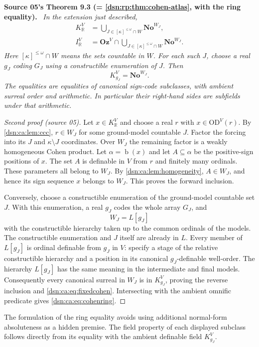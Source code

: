 \documentclass[11pt,a4paper]{article}
\numberwithin{equation}{section}
\theoremstyle{definition}
\theoremstyle{remark}
\newcommand{\No}{\mathbf{No}}
\newcommand{\Oz}{\mathbf{Oz}}
\newcommand{\OD}{\mathrm{OD}}
\newcommand{\R}{\mathbb R}
\newcommand{\bd}{\operatorname{b}}
\newenvironment{dupstatement}[1]{\par\medskip\noindent\textbf{#1.}\ \begingroup\itshape\ignorespaces}{\endgroup\par\medskip}
\newcommand{\KR}{K_{\R}}
\newcommand{\IR}{I_{\R}}
\begin{document}
\begin{dupstatement}{Source 05's Theorem 9.3 (= \cref{dsn:rp:thm:cohen-atlas}, with the ring equality)}
In the extension just described,
\begin{align}
 \KR^V
 &=\bigcup_{J\in[\kappa]^{\le\omega}\cap W}\No^{W_J},
 \label{dsn:ca:eq:cohenfield}\\
 \IR^V
 &=\Oz^V\cap
   \bigcup_{J\in[\kappa]^{\le\omega}\cap W}\No^{W_J}.
 \label{dsn:ca:eq:cohenring}
\end{align}
Here $[\kappa]^{\le\omega}\cap W$ means the sets countable \emph{in
$W$}. For each such $J$, choose a real $g_J$ coding $G_J$ using a
constructible enumeration of $J$. Then
\begin{equation}\label{dsn:ca:eq:fixedcohen}
 K_{g_J}^{V}=\No^{W_J}.
\end{equation}
The equalities are equalities of canonical sign-code subclasses, with
ambient surreal order and arithmetic. In particular their right-hand
sides are subfields under that arithmetic.
\end{dupstatement}
\begin{proof}[Second proof (source 05)]
Let $x\in\KR^V$ and choose a real $r$ with $x\in\OD^V(r)$.
By \cref{dsn:ca:lem:ccc}, $r\in W_J$ for some ground-model countable $J$.
Factor the forcing into its $J$ and $\kappa\setminus J$ coordinates.
Over $W_J$ the remaining factor is a weakly homogeneous Cohen product.
Let $\alpha=\bd(x)$ and let $A\subseteq\alpha$ be the positive-sign
positions of $x$. The set $A$ is definable in $V$ from $r$ and finitely
many ordinals. These parameters all belong to $W_J$. By
\cref{dsn:ca:lem:homogeneity}, $A\in W_J$, and hence its sign sequence $x$
belongs to $W_J$. This proves the forward inclusion.

Conversely, choose a constructible enumeration of the ground-model
countable set $J$. With this enumeration, a real $g_J$ codes the whole
array $G_J$, and
\[
 W_J=L[g_J]
\]
with the constructible hierarchy taken up to the common ordinals of
the models. The constructible enumeration and $J$ itself are already
in $L$. Every member of $L[g_J]$ is ordinal definable from $g_J$ in
$V$: specify a stage of the relative constructible hierarchy and a
position in its canonical $g_J$-definable well-order. The hierarchy
$L[g_J]$ has the same meaning in the intermediate and final models.
Consequently every canonical surreal in $W_J$ is in $K_{g_J}^{V}$,
proving the reverse inclusion and \eqref{dsn:ca:eq:fixedcohen}. Intersecting
with the ambient omnific predicate gives \eqref{dsn:ca:eq:cohenring}.
\end{proof}
The formulation of the ring equality avoids using additional
normal-form absoluteness as a hidden premise. The field property of
each displayed subclass follows directly from its equality with the
ambient definable field $K_{g_J}^{V}$.
\end{document}
